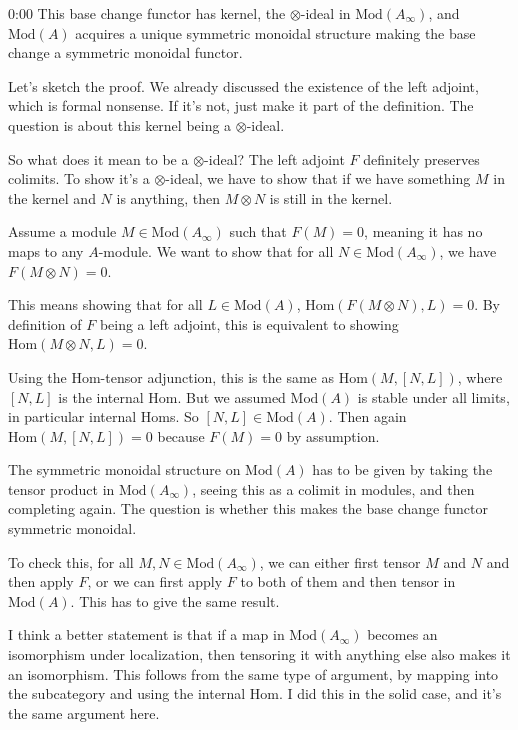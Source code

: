 \begin{unfinished}{0:00}
This base change functor has kernel, the $\otimes$-ideal in $\mathrm{Mod}(A_\infty)$, and $\mathrm{Mod}(A)$ acquires a unique symmetric monoidal structure making the base change a symmetric monoidal functor.

Let's sketch the proof. We already discussed the existence of the left adjoint, which is formal nonsense. If it's not, just make it part of the definition. The question is about this kernel being a $\otimes$-ideal.

So what does it mean to be a $\otimes$-ideal? The left adjoint $F$ definitely preserves colimits. To show it's a $\otimes$-ideal, we have to show that if we have something $M$ in the kernel and $N$ is anything, then $M \otimes N$ is still in the kernel.

Assume a module $M \in \mathrm{Mod}(A_\infty)$ such that $F(M) = 0$, meaning it has no maps to any $A$-module. We want to show that for all $N \in \mathrm{Mod}(A_\infty)$, we have $F(M \otimes N) = 0$. 

This means showing that for all $L \in \mathrm{Mod}(A)$, $\mathrm{Hom}(F(M \otimes N), L) = 0$. By definition of $F$ being a left adjoint, this is equivalent to showing $\mathrm{Hom}(M \otimes N, L) = 0$.

Using the Hom-tensor adjunction, this is the same as $\mathrm{Hom}(M, [N,L])$, where $[N,L]$ is the internal Hom. But we assumed $\mathrm{Mod}(A)$ is stable under all limits, in particular internal Homs. So $[N,L] \in \mathrm{Mod}(A)$. Then again $\mathrm{Hom}(M, [N,L]) = 0$ because $F(M) = 0$ by assumption.

The symmetric monoidal structure on $\mathrm{Mod}(A)$ has to be given by taking the tensor product in $\mathrm{Mod}(A_\infty)$, seeing this as a colimit in modules, and then completing again. The question is whether this makes the base change functor symmetric monoidal.

To check this, for all $M,N \in \mathrm{Mod}(A_\infty)$, we can either first tensor $M$ and $N$ and then apply $F$, or we can first apply $F$ to both of them and then tensor in $\mathrm{Mod}(A)$. This has to give the same result.

I think a better statement is that if a map in $\mathrm{Mod}(A_\infty)$ becomes an isomorphism under localization, then tensoring it with anything else also makes it an isomorphism. This follows from the same type of argument, by mapping into the subcategory and using the internal Hom. I did this in the solid case, and it's the same argument here.


\end{unfinished}
